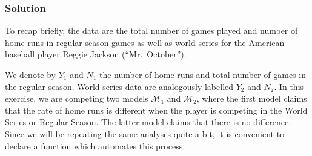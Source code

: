 \documentclass[
]{article}
\begin{document}
\subsubsection{Solution}\label{solution-1}

To recap briefly, the data are the total number of games played and
number of home runs in regular-season games as well as world series for
the American baseball player Reggie Jackson (``Mr.~October'').

We denote by \(Y_1\) and \(N_1\) the number of home runs and total
number of games in the regular season. World series data are analogously
labelled \(Y_2\) and \(N_2\). In this exercise, we are competing two
models \(\mathcal{M}_1\) and \(\mathcal{M}_2\), where the first model
claims that the rate of home runs is different when the player is
competing in the World Series or Regular-Season. The latter model claims
that there is no difference. Since we will be repeating the same
analyses quite a bit, it is convenient to declare a function which
automates this process.
\end{document}

